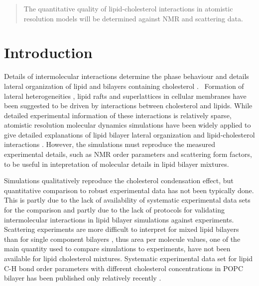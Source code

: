 \documentclass[aps,prl,superscriptaddress,twocolumn]{revtex4}
\begin{document}
\date{\today}

\begin{abstract}
The quantitative quality of lipid-cholesterol interactions in atomistic resolution models will be determined against 
NMR and scattering data.
\end{abstract}


\maketitle %



\section{Introduction}
Details of intermolecular interactions determine the phase
behaviour and details lateral organization of lipid and bilayers
containing cholesterol \cite{ipsen87}.~
Formation of lateral heterogeneities \cite{kinnunen91}, lipid rafts \cite{simons97}
and superlattices \cite{somerharju09} in cellular membranes have been
suggested to be driven by interactions between cholesterol
and lipids. While detailed experimental information of these interactions
is relatively sparse, atomistic resolution molecular dynamics simulations
have been widely applied to give detailed explanations of lipid bilayer
lateral organization and lipid-cholesterol interactions \cite{rog14,sodt14,??}.
However, the simulations must reproduce the measured experimental details, such as NMR
order parameters and scattering form factors, to be useful in intepretation
of molecular details in lipid bilayer mixtures.

Simulations qualitatively reproduce the cholesterol condensation effect,
but quantitative comparison to robust experimental data has not been
typically done. This is partly due to the lack of availability of
systematic experimental data sets for the comparison and partly
due to the lack of protocols for validating intermolecular interactions
in lipid bilayer simulations against experiments.
Scattering experiments are more difficult to interpret for
mixed lipid bilayers than for single component bilayers \cite{pan12,Heftberger15,Marquardt15,??},
thus area per molecule values, one of the main quantity used to
compare simulations to experiments, have not been
available for lipid cholesterol mixtures. Systematic experimental
data set for lipid C-H bond order parameters with different cholesterol
concentrations in POPC bilayer has been published only relatively recently \cite{ferreira13}.
\end{document}

